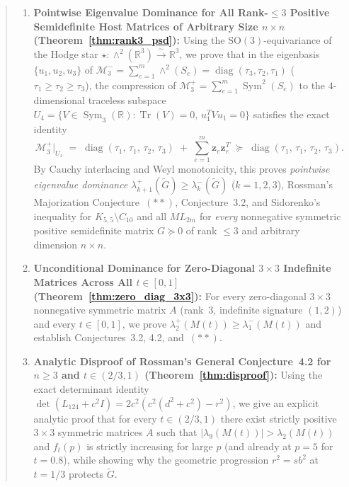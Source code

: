 \documentclass[11pt,a4paper]{article}
\theoremstyle{plain}
\theoremstyle{definition}
\theoremstyle{remark}
\DeclareMathOperator{\Tr}{Tr}
\DeclareMathOperator{\Sym}{Sym}
\DeclareMathOperator{\diag}{diag}
\begin{document}
\begin{abstract}
\begin{enumerate}[label=(\arabic*),nosep,leftmargin=2em]
  \item \textbf{Pointwise Eigenvalue Dominance for All Rank-$\le 3$ Positive Semidefinite Host Matrices of Arbitrary Size $n \times n$ (Theorem~\ref{thm:rank3_psd}):} Using the $\mathrm{SO}(3)$-equivariance of the Hodge star $\star : \wedge^2(\mathbb{R}^3) \xrightarrow{\sim} \mathbb{R}^3$, we prove that in the eigenbasis $\{u_1, u_2, u_3\}$ of $\mathcal{M}_3^- = \sum_{e=1}^m \wedge^2(S_e) = \diag(\tau_3, \tau_2, \tau_1)$ ($\tau_1 \ge \tau_2 \ge \tau_3$), the compression of $\mathcal{M}_3^+ = \sum_{e=1}^m \Sym^2(S_e)$ to the $4$-dimensional traceless subspace $U_4 = \{V \in \Sym_3(\mathbb{R}) : \Tr(V) = 0,\, u_1^T V u_1 = 0\}$ satisfies the exact identity
  \[
    \mathcal{M}_3^+\big|_{U_4} \;=\; \diag(\tau_1, \, \tau_1, \, \tau_2, \, \tau_3) \;+\; \sum_{e=1}^m \mathbf{z}_e \mathbf{z}_e^T \;\succeq\; \diag(\tau_1, \, \tau_1, \, \tau_2, \, \tau_3).
  \]
  By Cauchy interlacing and Weyl monotonicity, this proves \emph{pointwise eigenvalue dominance} $\lambda_{k+1}^+(\widetilde{G}) \ge \lambda_k^-(\widetilde{G})$ ($k = 1, 2, 3$), Rossman's Majorization Conjecture~$(**)$, Conjecture~3.2, and Sidorenko's inequality for $K_{5,5} \setminus C_{10}$ and all $ML_{2m}$ for \emph{every} nonnegative symmetric positive semidefinite matrix $G \succeq 0$ of rank $\le 3$ and arbitrary dimension $n \times n$.
  \item \textbf{Unconditional Dominance for Zero-Diagonal $3 \times 3$ Indefinite Matrices Across All $t \in [0,1]$ (Theorem~\ref{thm:zero_diag_3x3}):} For every zero-diagonal $3 \times 3$ nonnegative symmetric matrix $A$ (rank~$3$, indefinite signature $(1,2)$) and every $t \in [0,1]$, we prove $\lambda_2^+(M(t)) \ge \lambda_1^-(M(t))$ and establish Conjectures~3.2, 4.2, and~$(**)$.
  \item \textbf{Analytic Disproof of Rossman's General Conjecture~4.2 for $n \ge 3$ and $t \in (2/3, 1)$ (Theorem~\ref{thm:disproof}):} Using the exact determinant identity $\det(L_{124} + c^2 I) = 2c^2(c^2(d^2 + c^2) - r^2)$, we give an explicit analytic proof that for every $t \in (2/3, 1)$ there exist strictly positive $3 \times 3$ symmetric matrices $A$ such that $|\lambda_9(M(t))| > \lambda_2(M(t))$ and $f_t(p)$ is strictly increasing for large $p$ (and already at $p = 5$ for $t = 0.8$), while showing why the geometric progression $r^2 = s b^2$ at $t = 1/3$ protects $\widetilde{G}$.
\end{enumerate}
\end{abstract}

\tableofcontents
\end{document}
